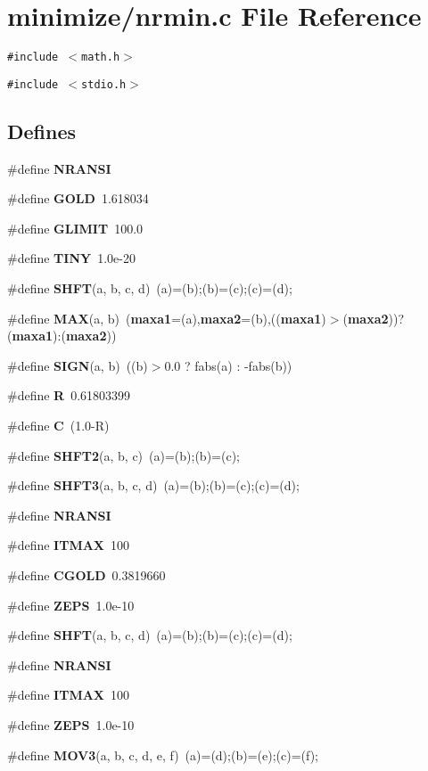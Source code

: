 \section{minimize/nrmin.c File Reference}
\label{nrmin_8c}
{\tt \#include $<$math.h$>$}\par
{\tt \#include $<$stdio.h$>$}\par
\subsection*{Defines}
\begin{CompactItemize}
\item 
\#define {\bf NRANSI}
\item 
\#define {\bf GOLD}~1.618034
\item 
\#define {\bf GLIMIT}~100.0
\item 
\#define {\bf TINY}~1.0e-20
\item 
\#define {\bf SHFT}(a, b, c, d)~(a)=(b);(b)=(c);(c)=(d);
\item 
\#define {\bf MAX}(a, b)~({\bf maxa1}=(a),{\bf maxa2}=(b),(({\bf maxa1})$>$({\bf maxa2}))?({\bf maxa1}):({\bf maxa2}))
\item 
\#define {\bf SIGN}(a, b)~((b)$>$0.0 ? fabs(a) : -fabs(b))
\item 
\#define {\bf R}~0.61803399
\item 
\#define {\bf C}~(1.0-R)
\item 
\#define {\bf SHFT2}(a, b, c)~(a)=(b);(b)=(c);
\item 
\#define {\bf SHFT3}(a, b, c, d)~(a)=(b);(b)=(c);(c)=(d);
\item 
\#define {\bf NRANSI}
\item 
\#define {\bf ITMAX}~100
\item 
\#define {\bf CGOLD}~0.3819660
\item 
\#define {\bf ZEPS}~1.0e-10
\item 
\#define {\bf SHFT}(a, b, c, d)~(a)=(b);(b)=(c);(c)=(d);
\item 
\#define {\bf NRANSI}
\item 
\#define {\bf ITMAX}~100
\item 
\#define {\bf ZEPS}~1.0e-10
\item 
\#define {\bf MOV3}(a, b, c, d, e, f)~(a)=(d);(b)=(e);(c)=(f);
\end{CompactItemize}
